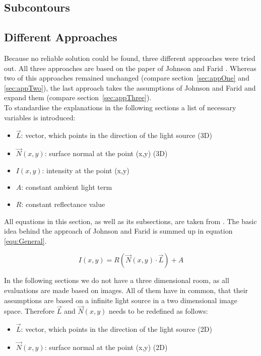 \subsection{Subcontours}\label{sec:subcontours}

\subsection{Different Approaches}\label{sec:approaches}
Because no reliable solution could be found, three different approaches were tried out. 
All three approaches are based on the paper of Johnson and Farid \cite{Johnson}. 
Whereas two of this approaches remained unchanged (compare section~\ref{sec:appOne} and \ref{sec:appTwo}), the last approach takes the assumptions of Johnson and Farid and expand them (compare section~\ref{sec:appThree}). \\
To standardise the explanations in the following sections a list of necessary variables is introduced: 
\begin{itemize}
\item $\vec{L}$: vector, which points in the direction of the light source (3D)
\item $\vec{N}(x,y)$: surface normal at the point (x,y) (3D)
\item $I(x,y)$: intensity at the point (x,y)
\item $A$: constant ambient light term
\item $R$: constant reflectance value
\end{itemize}
All equations in this section, as well as its subsections, are taken from \cite{Johnson}. The basic idea behind the approach of Johnson and Farid is summed up in equation \ref{equ:General}.

\begin{equation}
\label{equ:General}
I(x,y) = R(\vec{N}(x,y)\cdot \vec{L}) + A
\end{equation}

In the following sections we do not have a three dimensional room, as all evaluations are made based on images. All of them have in common, that their assumptions are based on a infinite light source in a two dimensional image space. Therefore $\vec{L}$ and $\vec{N}(x,y)$ needs to be redefined as follows:
\begin{itemize}
\item $\vec{L}$: vector, which points in the direction of the light source (2D)
\item $\vec{N}(x,y)$: surface normal at the point (x,y) (2D)
\end{itemize}

